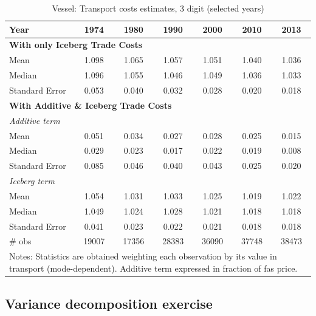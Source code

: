 \documentclass[a4paper,11pt]{article}
\begin{document}
\begin{table}[htbp]
  \centering
  \caption{Vessel: Transport costs estimates, 3 digit (selected years)}
\begin{center}
    \begin{tabular}{l|cccccc}
   \hline\hline
Year         & 1974  & 1980  & 1990  & 2000  & 2010  & 2013   \\
 \hline
   \multicolumn{7}{l}{\textbf{With only Iceberg Trade Costs} }  \\
Mean  & 1.098 & 1.065 & 1.057 & 1.051 & 1.040 & 1.036  \\
Median & 1.096 & 1.055 & 1.046 & 1.049 & 1.036 & 1.033  \\
Standard Error & 0.053 & 0.040 & 0.032 & 0.028 & 0.020 & 0.018  \\
\multicolumn{7}{l}{\textbf{With Additive \& Iceberg Trade Costs} }    \\
\hline
\multicolumn{7}{l}{\textit{Additive term } }  \\ \hline
Mean  & 0.051 & 0.034 & 0.027 & 0.028 & 0.025 & 0.015  \\
Median & 0.029 & 0.023 & 0.017 & 0.022 & 0.019 & 0.008 \\
Standard Error & 0.085 & 0.046 & 0.040 & 0.043 & 0.025 & 0.020 \\ \hline
\multicolumn{7}{l}{\textit{Iceberg term} } \\ \hline
Mean  & 1.054 & 1.031 & 1.033 & 1.025 & 1.019 & 1.022 \\
Median & 1.049 & 1.024 & 1.028 & 1.021 & 1.018 & 1.018  \\
Standard Error & 0.041 & 0.023 & 0.022 & 0.021 & 0.018 & 0.018  \\
\hline
 \# obs & 19007 & 17356 & 28383 & 36090 & 37748 & 38473 \\ \hline
\hline\hline
\multicolumn{7}{l}{\parbox[l]{11cm}{ \vspace{7pt}\scriptsize{Notes: Statistics are obtained weighting each observation by its value in transport (mode-dependent). Additive term expressed in fraction of fas price.}}}
\end{tabular}%
\end{center} \label{tab:result_ves_3d_detail}
\end{table}%


\subsection{Variance decomposition exercise \label{app:decomp_variance}}
\end{document}
